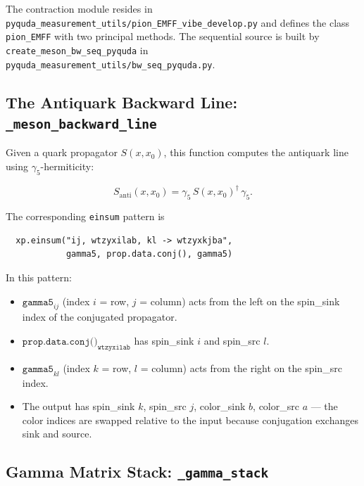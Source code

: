 \documentclass[11pt,a4paper]{article}
\newcommand{\gfive}{\gamma_5}
\newcommand{\Santi}{S_{\text{anti}}}
\newcommand{\einsum}{\texttt{einsum}}
\begin{document}
The contraction module resides in
\texttt{pyquda\_measurement\_utils/pion\_EMFF\_vibe\_develop.py} and defines
the class \texttt{pion\_EMFF} with two principal methods.  The sequential source
is built by \texttt{create\_meson\_bw\_seq\_pyquda} in
\texttt{pyquda\_measurement\_utils/bw\_seq\_pyquda.py}.

\subsection{The Antiquark Backward Line: \texttt{\_meson\_backward\_line}}

Given a quark propagator \(S(x, x_0)\), this function computes the antiquark
line using \(\gfive\)-hermiticity:

\begin{equation}
\Santi(x, x_0) = \gfive \, S(x, x_0)^\dagger \, \gfive .
\label{eq:mesh_backward}
\end{equation}

The corresponding \einsum{} pattern is

\begin{verbatim}
  xp.einsum("ij, wtzyxilab, kl -> wtzyxkjba",
            gamma5, prop.data.conj(), gamma5)
\end{verbatim}

In this pattern:
\begin{itemize}[nosep]
  \item \(\texttt{gamma5}_{ij}\) (index \(i\) = row, \(j\) = column) acts from
        the left on the spin\_sink index of the conjugated propagator.
  \item \(\texttt{prop.data.conj()}_{\texttt{wtzyxilab}}\) has spin\_sink \(i\)
        and spin\_src \(l\).
  \item \(\texttt{gamma5}_{kl}\) (index \(k\) = row, \(l\) = column) acts from
        the right on the spin\_src index.
  \item The output has spin\_sink \(k\), spin\_src \(j\), color\_sink \(b\),
        color\_src \(a\) --- the color indices are swapped relative to the input
        because conjugation exchanges sink and source.
\end{itemize}

\subsection{Gamma Matrix Stack: \texttt{\_gamma\_stack}}
\end{document}
